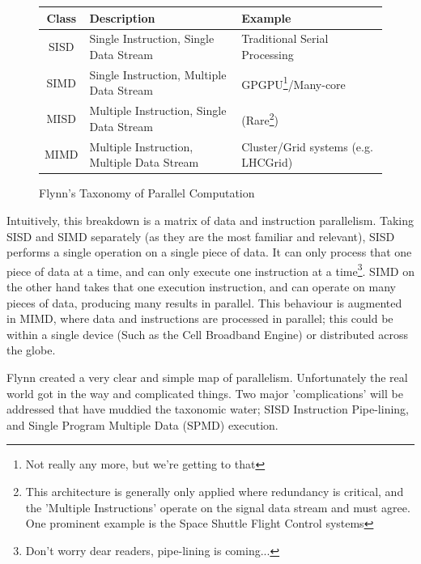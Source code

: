 \begin{figure}[h!]
  \begin{minipage}{\textwidth}
\begin{tabularx}{\textwidth}{|c|p{7.5cm}|X|}
  \hline
  Class&Description&Example\\ \hline
  SISD&Single Instruction, Single Data Stream&Traditional Serial Processing\nomenclature{SISD}{Single Instruction, Single Data Stream}\\
  SIMD&Single Instruction, Multiple Data Stream&GPGPU\footnote{Not really any more, but we're getting to that}/Many-core\nomenclature{SIMD}{Single Instruction, Multiple Data Stream}\\
  MISD&Multiple Instruction, Single Data Stream&(Rare\footnote{This architecture is generally only applied where redundancy is critical, and the 'Multiple Instructions' operate on the signal data stream and must agree. One prominent example is the Space Shuttle Flight Control systems})\nomenclature{MISD}{Multiple Instruction, Single Data Stream}\\
  MIMD&Multiple Instruction, Multiple Data Stream&Cluster/Grid systems (e.g. LHCGrid)\nomenclature{MIMD}{Multiple Instruction, Multiple Data Stream}\\
  \hline
\end{tabularx}\caption{Flynn's Taxonomy of Parallel Computation}\label{tab:flynn}
\end{minipage}
\end{figure}

Intuitively, this breakdown is a matrix of data and instruction parallelism. Taking SISD and SIMD separately (as they are the most familiar and relevant), SISD performs a single operation on a single piece of data. It can only process that one piece of data at a time, and can only execute one instruction at a time\footnote{Don't worry dear readers, pipe-lining is coming...}. SIMD on the other hand takes that one execution instruction, and can operate on many pieces of data, producing many results in parallel. This behaviour is augmented in MIMD, where data and instructions are processed in parallel; this could be within a single device (Such as the Cell Broadband Engine) or distributed across the globe.

Flynn created a very clear and simple map of parallelism. Unfortunately the real world got in the way and complicated things. Two major 'complications' will be addressed that have muddied the taxonomic water; SISD Instruction Pipe-lining, and Single Program Multiple Data (SPMD) execution.

